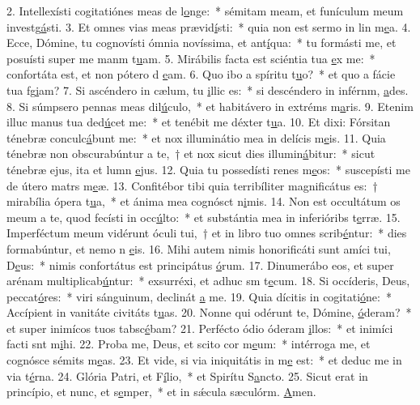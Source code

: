 2. Intellexísti cogitatiónes meas de l\uline{o}nge:~* sémitam meam, et funículum meum investg\uline{á}sti.
3. Et omnes vias meas prævid\uline{í}sti:~* quia non est sermo in lin m\uline{e}a.
4. Ecce, Dómine, tu cognovísti ómnia novíssima, et ant\uline{í}qua:~* tu formásti me, et posuísti super me manm t\uline{u}am.
5. Mirábilis facta est sciéntia tua \uline{e}x me:~* confortáta est, et non pótero d \uline{e}am.
6. Quo ibo a spíritu t\uline{u}o?~* et quo a fácie tua fg\uline{i}am?
7. Si ascéndero in cælum, tu \uline{i}llic es:~* si descéndero in inférnm, \uline{a}des.
8. Si súmpsero pennas meas dil\uline{ú}culo,~* et habitávero in extréms m\uline{a}ris.
9. Etenim illuc manus tua ded\uline{ú}cet me:~* et tenébit me déxter t\uline{u}a.
10. Et dixi: Fórsitan ténebræ conculc\uline{á}bunt me:~* et nox illuminátio mea in delícis m\uline{e}is.
11. Quia ténebræ non obscurabúntur a te,~† et nox sicut dies illumin\uline{á}bitur:~* sicut ténebræ ejus, ita et lumn \uline{e}jus.
12. Quia tu possedísti renes m\uline{e}os:~* suscepísti me de útero matrs m\uline{e}æ.
13. Confitébor tibi quia terribíliter magnificátus es:~† mirabília ópera t\uline{u}a,~* et ánima mea cognósct n\uline{i}mis.
14. Non est occultátum os meum a te, quod fecísti in occ\uline{ú}lto:~* et substántia mea in inferióribs t\uline{e}rræ.
15. Imperféctum meum vidérunt óculi tui,~† et in libro tuo omnes scrib\uline{é}ntur:~* dies formabúntur, et nemo n \uline{e}is.
16. Mihi autem nimis honorificáti sunt amíci tui, D\uline{e}us:~* nimis confortátus est principátus \uline{ó}rum.
17. Dinumerábo eos, et super arénam multiplicab\uline{ú}ntur:~* exsurréxi, et adhuc sm t\uline{e}cum.
18. Si occíderis, Deus, peccat\uline{ó}res:~* viri sánguinum, declinát \uline{a} me.
19. Quia dícitis in cogitati\uline{ó}ne:~* Accípient in vanitáte civitáts t\uline{u}as.
20. Nonne qui odérunt te, Dómine, \uline{ó}deram?~* et super inimícos tuos tabsc\uline{é}bam?
21. Perfécto ódio óderam \uline{i}llos:~* et inimíci facti snt m\uline{i}hi.
22. Proba me, Deus, et scito cor m\uline{e}um:~* intérroga me, et cognósce sémits m\uline{e}as.
23. Et vide, si via iniquitátis in m\uline{e} est:~* et deduc me in via t\uline{é}rna.
24. Glória Patri, et F\uline{í}lio,~* et Spirítu S\uline{a}ncto.
25. Sicut erat in princípio, et nunc, et s\uline{e}mper,~* et in sǽcula sæculórm. \uline{A}men.
